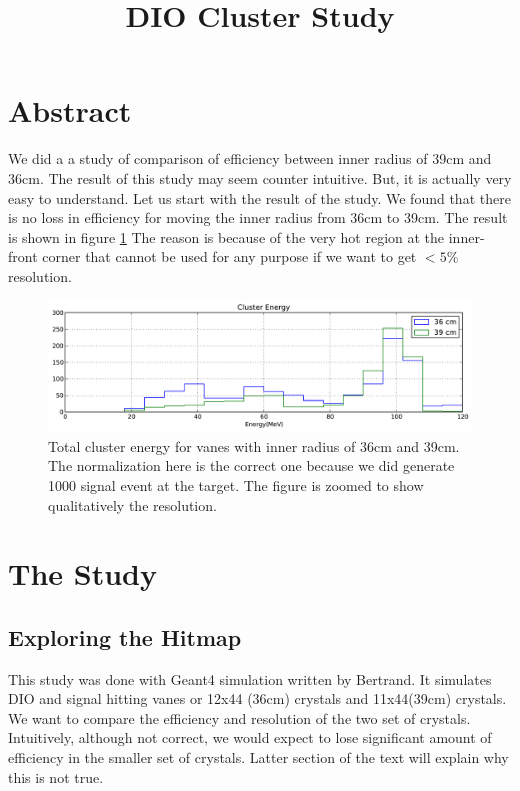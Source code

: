 \documentclass[11pt]{article}
\title{DIO Cluster Study}
\begin{document}
\maketitle

\section{Abstract}

We did a a study of comparison of efficiency between inner radius of 39cm and 36cm. The result of this study may seem counter intuitive. But, it is actually very easy to understand. Let us start with the result of the study. We found that there is no loss in efficiency for moving the inner radius from 36cm to 39cm. The result is shown in figure \ref{fig:cluster_energy} The reason is because of the very hot region at the inner-front corner that cannot be used for any purpose if we want to get $<5\%$ resolution.
\begin{figure}[htbp]
   \centering
   \includegraphics[width=\textwidth]{../plot/clusterenergy.pdf} %
   \caption{Total cluster energy for vanes with inner radius of 36cm and 39cm. The normalization here is the correct one because we did generate 1000 signal event at the target. The figure is zoomed to show qualitatively the resolution.}
   \label{fig:cluster_energy}
\end{figure}

\section{The Study}
\subsection{Exploring the Hitmap}
This study was done with Geant4 simulation written by Bertrand. It simulates DIO and signal hitting vanes or 12x44 (36cm) crystals and 11x44(39cm) crystals. We want to compare the efficiency and resolution of the two set of crystals. Intuitively, although not correct, we would expect to lose significant amount of efficiency in the smaller set of crystals. Latter section of the text will explain why this is not true. 
\end{document}
